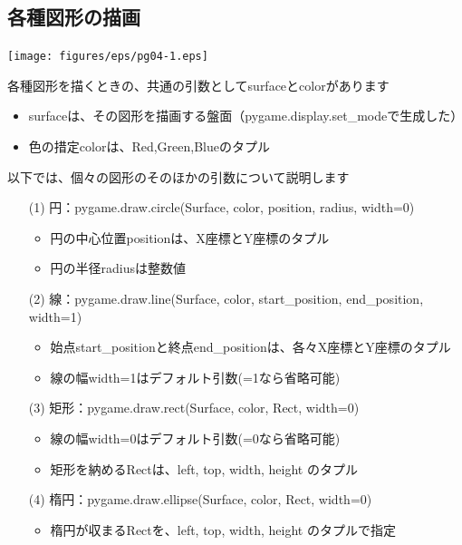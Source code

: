 \documentclass[uplatex,a4paper,11pt,oneside,openany]{jsbook}
\begin{document}
\subsection{各種図形の描画}

\begin{center}
\texttt{[image: figures/eps/pg04-1.eps]}
\end{center}

各種図形を描くときの、共通の引数としてsurfaceとcolorがあります

\begin{itemize}
\item surfaceは、その図形を描画する盤面（pygame.display.set\_modeで生成した）
\item 色の措定colorは、Red,Green,Blueのタプル
\end{itemize}

以下では、個々の図形のそのほかの引数について説明します

\begin{enumerate}

  \item[(1)] 円：pygame.draw.circle(Surface, color, position, radius, width=0)

  \begin{itemize}
  \item 円の中心位置positionは、X座標とY座標のタプル
  \item 円の半径radiusは整数値
  \end{itemize}

  \item[(2)] 線：pygame.draw.line(Surface, color, start\_position, end\_position, width=1)

  \begin{itemize}
  \item 始点start\_positionと終点end\_positionは、各々X座標とY座標のタプル
  \item 線の幅width=1はデフォルト引数(=1なら省略可能)
  \end{itemize}

  \item[(3)] 矩形：pygame.draw.rect(Surface, color, Rect, width=0)

  \begin{itemize}
  \item 線の幅width=0はデフォルト引数(=0なら省略可能)
  \item 矩形を納めるRectは、left, top, width, height のタプル
  \end{itemize}

  \item[(4)] 楕円：pygame.draw.ellipse(Surface, color, Rect, width=0)

  \begin{itemize}
  \item 楕円が収まるRectを、left, top, width, height のタプルで指定
  \end{itemize}

\end{enumerate}
\end{document}
